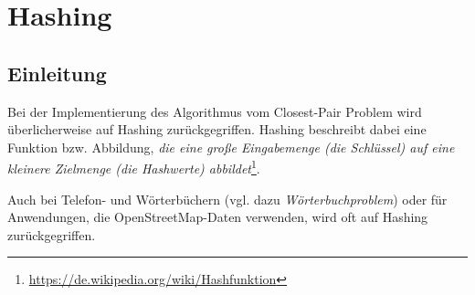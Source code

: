 \documentclass{scrartcl}%
\begin{document}

    \section*{Hashing}\label{sec:hashing}
    \subsection*{Einleitung}\label{subsec:einleitung}
    Bei der Implementierung des Algorithmus vom Closest-Pair Problem wird überlicherweise auf Hashing zurückgegriffen.
    Hashing beschreibt dabei eine Funktion bzw. Abbildung, \textit{die eine große Eingabemenge (die Schlüssel)
    auf eine kleinere Zielmenge (die Hashwerte) abbildet}\footnote{\url{https://de.wikipedia.org/wiki/Hashfunktion}}.

    Auch bei Telefon- und Wörterbüchern (vgl. dazu \textit{Wörterbuchproblem}) oder für Anwendungen,
    die OpenStreetMap-Daten verwenden, wird oft auf Hashing zurückgegriffen.

    \begin{figure}[H]
        \centering
    \end{figure}
\end{document}
